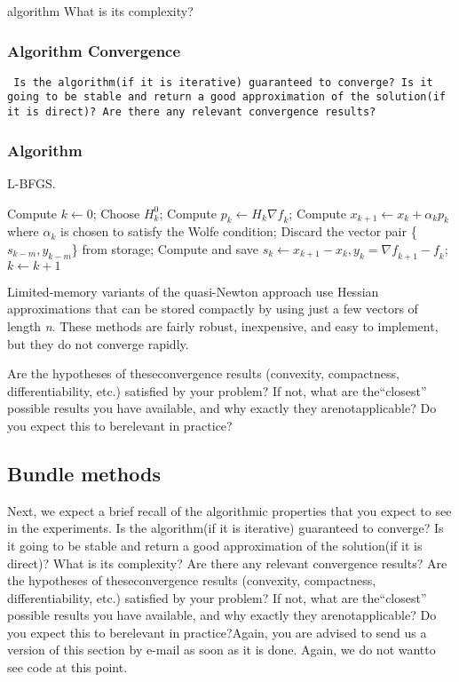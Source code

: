 algorithm What is its complexity?

\subsubsection{Algorithm Convergence}
\texttt{ Is the algorithm(if it is iterative) guaranteed to converge? Is it going to be stable and return a good approximation of the solution(if it is direct)?  Are there any relevant convergence results?}

\subsubsection{Algorithm}
\begin{algorithm}[H]
	\caption{L-BFGS.}
	\label{alg:sgd}
	\begin{algorithmic}[1]
		\State Compute $k \gets 0$;
		\Repeat
		\State Choose \textbf{$H^0_k$};
		\State Compute $p_k \gets H_k\nabla \textit{f}_k$;
		\State Compute $x_{k+1} \gets x_{k}+ \alpha_{k}p_{k}$ where $\alpha_{k}$ is chosen to satisfy the Wolfe condition;
		\State Discard the vector pair \{$s_{k-m},y_{k-m}$\} from storage;
		\EndIf
		\State Compute and save $s_k \gets x_{k+1}-x_{k}, y_k=\nabla \textit{f}_{k+1}-\textit{f}_k$;
		\State $k \gets k+1$
		\EndProcedure 
	\end{algorithmic}
\end{algorithm}


Limited-memory variants  of  the  quasi-Newton  approach use  Hessian  approximations  that  can  be stored compactly by using just a few vectors of length \textit{n}. These methods are fairly robust, inexpensive, and easy to implement, but they do not converge rapidly.

 
  Are the hypotheses of theseconvergence results (convexity, compactness, differentiability, etc.) satisfied by your problem? If not, what are the“closest” possible results you have available, and why exactly they arenotapplicable?  Do you expect this to berelevant in practice?

\subsection{Bundle methods}


Next, we expect a brief recall of the algorithmic properties that you expect to see in the experiments. Is the algorithm(if it is iterative) guaranteed to converge? Is it going to be stable and return a good approximation of the solution(if it is direct)? What is its complexity? Are there any relevant convergence results? Are the hypotheses of theseconvergence results (convexity, compactness, differentiability, etc.) satisfied by your problem? If not, what are the“closest” possible results you have available, and why exactly they arenotapplicable?  Do you expect this to berelevant in practice?Again, you are advised to send us a version of this section by e-mail as soon as it is done. Again, we do not wantto see code at this point.